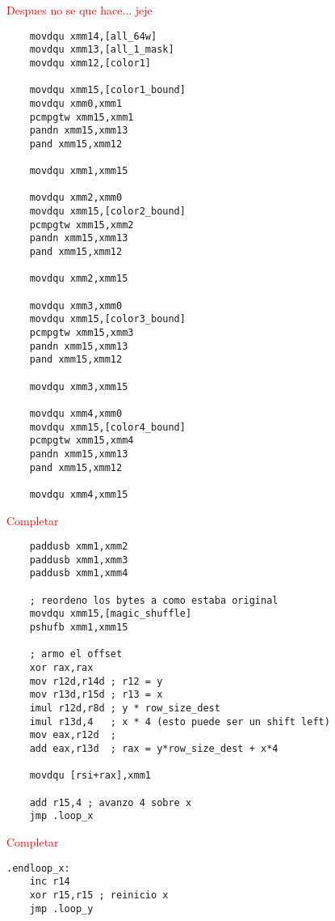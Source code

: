 \documentclass[a4paper]{article}
\begin{document}
\textcolor{red}{Despues no se que hace... jeje}
\begin{codesnippet}
\begin{verbatim}
    movdqu xmm14,[all_64w]
    movdqu xmm13,[all_1_mask]
    movdqu xmm12,[color1]

    movdqu xmm15,[color1_bound]
    movdqu xmm0,xmm1 
    pcmpgtw xmm15,xmm1
    pandn xmm15,xmm13
    pand xmm15,xmm12

    movdqu xmm1,xmm15

    movdqu xmm2,xmm0
    movdqu xmm15,[color2_bound]
    pcmpgtw xmm15,xmm2
    pandn xmm15,xmm13
    pand xmm15,xmm12

    movdqu xmm2,xmm15

    movdqu xmm3,xmm0
    movdqu xmm15,[color3_bound]
    pcmpgtw xmm15,xmm3
    pandn xmm15,xmm13
    pand xmm15,xmm12

    movdqu xmm3,xmm15

    movdqu xmm4,xmm0
    movdqu xmm15,[color4_bound]
    pcmpgtw xmm15,xmm4
    pandn xmm15,xmm13
    pand xmm15,xmm12

    movdqu xmm4,xmm15
\end{verbatim}
\end{codesnippet}

\indent \textcolor{red}{Completar}
\begin{codesnippet}
\begin{verbatim}
    paddusb xmm1,xmm2
    paddusb xmm1,xmm3
    paddusb xmm1,xmm4

    ; reordeno los bytes a como estaba original
    movdqu xmm15,[magic_shuffle] 
    pshufb xmm1,xmm15
    
    ; armo el offset
    xor rax,rax
    mov r12d,r14d ; r12 = y
    mov r13d,r15d ; r13 = x
    imul r12d,r8d ; y * row_size_dest
    imul r13d,4   ; x * 4 (esto puede ser un shift left)
    mov eax,r12d  ; 
    add eax,r13d  ; rax = y*row_size_dest + x*4 

    movdqu [rsi+rax],xmm1

    add r15,4 ; avanzo 4 sobre x
    jmp .loop_x
\end{verbatim}
\end{codesnippet}

\indent \textcolor{red}{Completar}
\begin{codesnippet}
\begin{verbatim}
.endloop_x:
    inc r14
    xor r15,r15 ; reinicio x
    jmp .loop_y
\end{verbatim}
\end{codesnippet}
\end{document}

